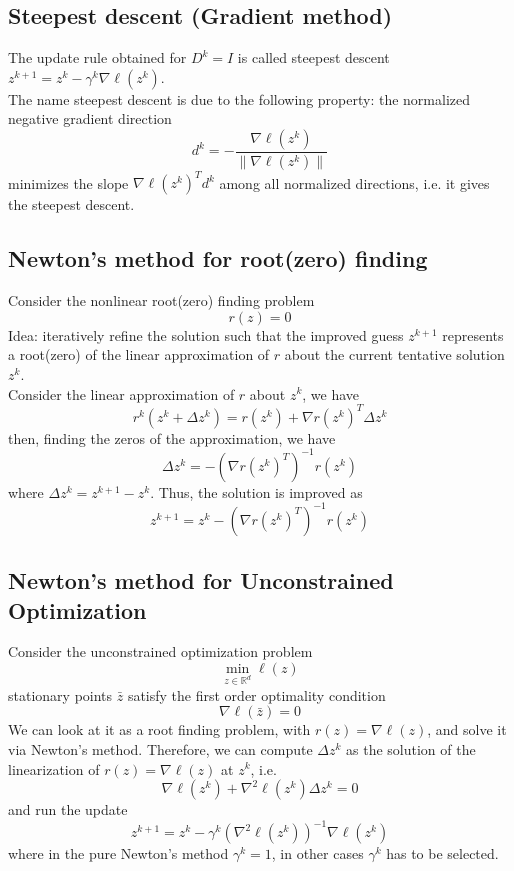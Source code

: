 \documentclass[openany]{book}
\newcommand{\R}{\mathbb{R}}                %
\theoremstyle{definition}
\theoremstyle{remark}
\begin{document}
\subsection{Steepest descent (Gradient method)}
The update rule obtained for $D^k=I$ is called steepest descent $z^{k+1} = z^k-\gamma^k\nabla\ell(z^k)$.\\
The name steepest descent is due to the following property: the normalized negative gradient direction 
\[
    d^k = -\displaystyle\frac{\nabla\ell(z^k)}{\|\nabla\ell(z^k)\|}
\]
minimizes the slope $\nabla \ell(z^k)^Td^k$ among all normalized directions, i.e. it gives the steepest descent.

\subsection{Newton's method for root(zero) finding}

Consider the nonlinear root(zero) finding problem 
\[
    r(z) = 0
\]
Idea: iteratively refine the solution such that the improved guess $z^{k+1}$ represents a root(zero) of the linear approximation of $r$ about the current tentative solution $z^k$.\\ 
Consider the linear approximation of $r$ about $z^k$, we have 
\[
    r^k(z^k+\Delta z^k) = r(z^k)+\nabla r(z^k)^T\Delta z^k
\]
then, finding the zeros of the approximation, we have
\[
    \Delta z^k = -(\nabla r(z^k)^T)^{-1}r(z^k)
\]
where $\Delta z^k = z^{k+1}-z^k$.
Thus, the solution is improved as 
\[
    z^{k+1} = z^k-(\nabla r(z^k)^T)^{-1}r(z^k)
\]

\subsection{Newton's method for Unconstrained Optimization}
Consider the unconstrained optimization problem 
\[
    \min_{z\in\R^d} \ell(z)
\]
stationary points $\bar{z}$ satisfy the first order optimality condition 
\[
    \nabla \ell (\bar{z}) = 0
\]
We can look at it as a root finding problem, with $r(z)=\nabla\ell(z)$, and solve it via Newton's method. Therefore, we can compute $\Delta z^k$ as the solution of the linearization of $r(z)=\nabla\ell(z)$ at $z^k$, i.e. 
\[
    \nabla \ell(z^k) + \nabla^2\ell(z^k)\Delta z^k = 0
\]
and run the update 
\[
    z^{k+1} = z^k -\gamma^k(\nabla^2\ell(z^k))^{-1}\nabla\ell(z^k)
\]
where in the pure Newton's method $\gamma^k=1$, in other cases $\gamma^k$ has to be selected.
\end{document}
